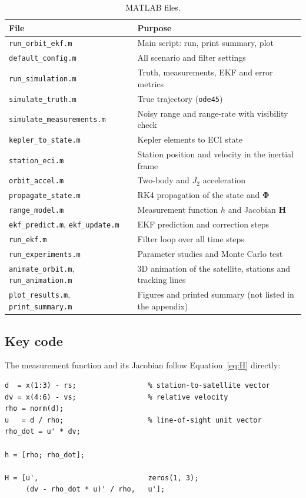 \documentclass[11pt,a4paper]{article}
\newcommand{\bH}{\mathbf{H}}
\begin{document}
\begin{table}[H]
\centering
\caption{MATLAB files.}
\label{tab:files}
\begin{tabular}{p{}p{}}
\toprule
\textbf{File} & \textbf{Purpose} \\
\midrule
\texttt{run\_orbit\_ekf.m} & Main script: run, print summary, plot \\
\texttt{default\_config.m} & All scenario and filter settings \\
\texttt{run\_simulation.m} & Truth, measurements, EKF and error metrics \\
\texttt{simulate\_truth.m} & True trajectory (\texttt{ode45}) \\
\texttt{simulate\_measurements.m} & Noisy range and range-rate with visibility check \\
\texttt{kepler\_to\_state.m} & Kepler elements to ECI state \\
\texttt{station\_eci.m} & Station position and velocity in the inertial frame \\
\texttt{orbit\_accel.m} & Two-body and $J_2$ acceleration \\
\texttt{propagate\_state.m} & RK4 propagation of the state and $\boldsymbol\Phi$ \\
\texttt{range\_model.m} & Measurement function $h$ and Jacobian $\bH$ \\
\texttt{ekf\_predict.m}, \texttt{ekf\_update.m} & EKF prediction and correction steps \\
\texttt{run\_ekf.m} & Filter loop over all time steps \\
\texttt{run\_experiments.m} & Parameter studies and Monte Carlo test \\
\texttt{animate\_orbit.m}, \texttt{run\_animation.m} & 3D animation of the satellite, stations and tracking lines \\
\texttt{plot\_results.m}, \texttt{print\_summary.m} & Figures and printed summary (not listed in the appendix) \\
\bottomrule
\end{tabular}
\end{table}

\subsection{Key code}
The measurement function and its Jacobian follow Equation~\eqref{eq:H} directly:
\begin{lstlisting}
d  = x(1:3) - rs;                 % station-to-satellite vector
dv = x(4:6) - vs;                 % relative velocity
rho = norm(d);
u   = d / rho;                    % line-of-sight unit vector
rho_dot = u' * dv;

h = [rho; rho_dot];

H = [u',                          zeros(1, 3);
     (dv - rho_dot * u)' / rho,   u'];
\end{lstlisting}
\end{document}
